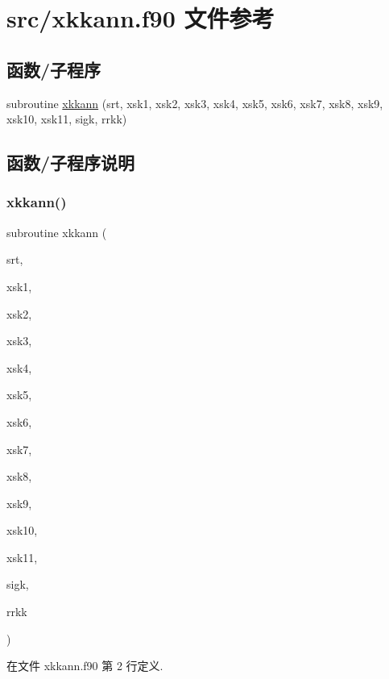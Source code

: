 \hypertarget{xkkann_8f90}{}\section{src/xkkann.f90 文件参考}
\label{xkkann_8f90}
\subsection*{函数/子程序}
\begin{DoxyCompactItemize}
\item 
subroutine \mbox{\hyperlink{xkkann_8f90_add7896ff3a582cd88509587f30c835ca}{xkkann}} (srt, xsk1, xsk2, xsk3, xsk4, xsk5, xsk6, xsk7, xsk8, xsk9, xsk10, xsk11, sigk, rrkk)
\end{DoxyCompactItemize}


\subsection{函数/子程序说明}
\mbox{\label{xkkann_8f90_add7896ff3a582cd88509587f30c835ca}} 
\subsubsection{\texorpdfstring{xkkann()}{xkkann()}}
{\footnotesize\ttfamily subroutine xkkann (\begin{DoxyParamCaption}\item[{}]{srt,  }\item[{}]{xsk1,  }\item[{}]{xsk2,  }\item[{}]{xsk3,  }\item[{}]{xsk4,  }\item[{}]{xsk5,  }\item[{}]{xsk6,  }\item[{}]{xsk7,  }\item[{}]{xsk8,  }\item[{}]{xsk9,  }\item[{}]{xsk10,  }\item[{}]{xsk11,  }\item[{}]{sigk,  }\item[{}]{rrkk }\end{DoxyParamCaption})}



在文件 xkkann.\+f90 第 2 行定义.

